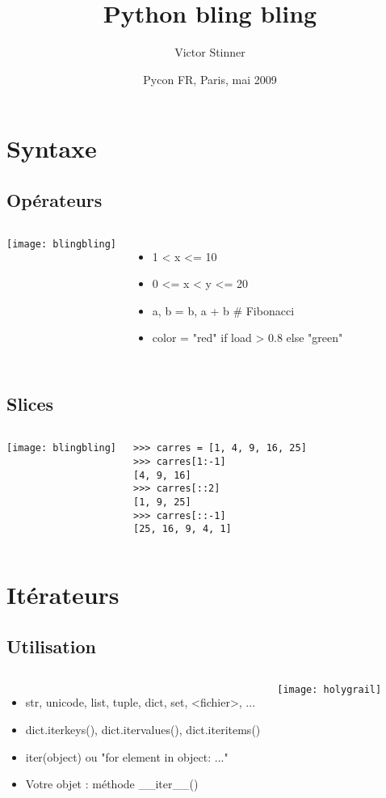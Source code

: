 \documentclass[handout]{beamer}
\title[Fonctionnalités sexy de Python]{Python bling bling}
\author{Victor Stinner}
\date{Pycon FR, Paris, mai 2009}
\begin{document}
\begin{frame}
    \titlepage
\end{frame}

\section{Syntaxe}

\subsection{Opérateurs}
\frame
{
\begin{columns}[c]
    \texttt{[image: blingbling]}
    \begin{itemize}
    \item 1 < x <= 10
    \item 0 <= x < y <= 20
    \item a, b = b, a + b \# Fibonacci
    \item color = "red" if load > 0.8 else "green"
    \end{itemize}
\end{columns}
}

\subsection{Slices}
\begin{frame}[fragile]
\begin{columns}[c]
    \texttt{[image: blingbling]}
\begin{verbatim}
>>> carres = [1, 4, 9, 16, 25]
>>> carres[1:-1]
[4, 9, 16]
>>> carres[::2]
[1, 9, 25]
>>> carres[::-1]
[25, 16, 9, 4, 1]
\end{verbatim}
\end{columns}
\end{frame}

\section{Itérateurs}

\subsection{Utilisation}
\begin{frame}
\begin{columns}[c]
    \begin{itemize}
    \item str, unicode, list, tuple, dict, set, <fichier>, ...
    \item dict.iterkeys(), dict.itervalues(), dict.iteritems()
    \item iter(object) ou "for element in object: ..."
    \item Votre objet : méthode \_\_iter\_\_()
    \end{itemize}
    \texttt{[image: holygrail]}
\end{columns}
\end{frame}
\end{document}
